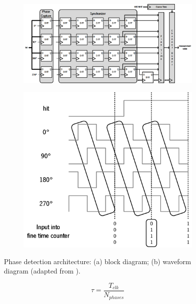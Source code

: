 \begin{figure}[ht!]
	\centering
	\begin{subfigure}[b]{0.95\textwidth}
		\centering
		\includegraphics[width=\textwidth]{img/02_StateofArt/phase_detection.png}
		\caption{}
		\label{fig:phase_detection_bd}
	\end{subfigure}
	\begin{subfigure}[b]{.5\textwidth}
		\centering
		\includegraphics[width=\textwidth]{img/02_StateofArt/phase_detection_wf.png}
		\caption{}
		\label{fig:phase_detection_wf}
	\end{subfigure}
	\caption{Phase detection architecture: (a) block diagram; (b) waveform diagram (adapted from \citep{phase_det}).}
	\label{fig:phase_detection}
\end{figure}

\begin{equation}
	\tau = \frac {T_{clk}} {N_{phases}}
	\label{eq:pc_resolution}
\end{equation}

